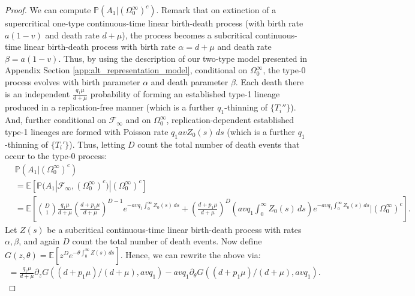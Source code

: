 \documentclass{article}
\numberwithin{equation}{section}
\begin{document}
\begin{proof}
  We can compute $\mathbb{P}(A_1|(\Omega_0^{\infty})^c)$. Remark that on extinction of a supercritical one-type continuous-time linear birth-death process (with birth rate $a(1-v)$ and death rate $d+\mu$), the process becomes a subcritical continuous-time linear birth-death process with birth rate $\alpha=d+\mu$ and death rate $\beta=a(1-v)$. Thus, by using the description of our two-type model presented in Appendix Section \ref{app:alt_representation_model}, conditional on $\Omega_0^\infty$, the type-0 process evolves with birth parameter $\alpha$ and death parameter $\beta$. Each death there is an independent $\frac{q_1\mu}{d+\mu}$ probability of forming an established type-1 lineage produced in a replication-free manner (which is a further $q_1$-thinning of $\{T_i''\}$). And, further conditional on $\mathcal{F}_\infty$ and on $\Omega_0^\infty$, replication-dependent established type-1 lineages are formed with Poisson rate $q_1avZ_0(s)\,ds$ (which is a further $q_1$-thinning of $\{T_i'\}$). Thus, letting $D$ count the total number of death events that occur to the type-0 process:
  \begin{align*}
    &\mathbb{P}(A_1|(\Omega_0^{\infty})^c)\\
    &=\mathbb{E}\left[\mathbb{P}(A_1|\mathcal{F}_\infty,\left(\Omega_0^\infty\right)^c)|\left(\Omega_0^\infty\right)^c\right]\\
    &=\mathbb{E}\left[{D\choose 1}\frac{q_1\mu}{d+\mu}\left(\frac{d+p_1\mu}{d+\mu}\right)^{D-1}e^{-avq_1\int_0^\infty Z_0(s)\,ds}+\left(\frac{d+p_1\mu}{d+\mu}\right)^D\left(avq_1\int_0^\infty Z_0(s)\,ds\right)e^{-avq_1\int_0^\infty Z_0(s)\,ds}|(\Omega_0^\infty)^c\right].
  \end{align*}
  Let $Z(s)$ be a subcritical continuous-time linear birth-death process with rates $\alpha,\beta$, and again $D$ count the total number of death events. Now define $G(z,\theta)=\mathbb{E}\left[z^De^{-\theta \int_0^\infty Z(s)\,ds}\right]$. Hence, we can rewrite the above via:
  \begin{align}
      =\frac{q_1\mu}{d+\mu}\partial_z G((d+p_1\mu)/(d+\mu),avq_1)-avq_1\partial_\theta G((d+p_1\mu)/(d+\mu),avq_1)\label{eq:P_expr_in_G}.
  \end{align}


\end{proof}
\end{document}
